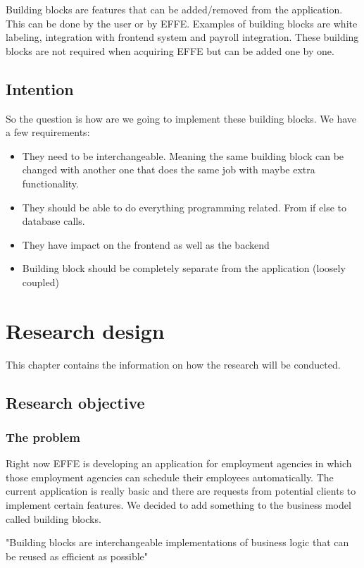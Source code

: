 \documentclass{report}
\begin{document}
Building blocks are features that can be added/removed from the application. This can be done by the user or by EFFE. Examples of building blocks are white labeling, integration with frontend system and payroll integration. These building blocks are not required when acquiring EFFE but can be added one by one.

\section{Intention}
So the question is how are we going to implement these building blocks. We have a few requirements:
\begin{itemize}
	\item They need to be interchangeable. Meaning the same building block can be changed with another one that does the same job with maybe extra functionality.
	
	\item They should be able to do everything programming related. From if else to database calls.
	
	\item They have impact on the frontend as well as the backend
	
	\item Building block should be completely separate from the application (loosely coupled)
\end{itemize}

\chapter{Research design}
This chapter contains the information on how the research will be conducted.

\section{Research objective}

\subsection{The problem}
Right now EFFE is developing an application for employment agencies in which those employment agencies can schedule their employees automatically. The current application is really basic and there are requests from potential clients to implement certain features. We decided to add something to the business model called building blocks.

\begin{displayquote}
	\large{"Building blocks are interchangeable implementations of business logic that can be reused as efficient as possible"}
\end{displayquote}
\end{document}
